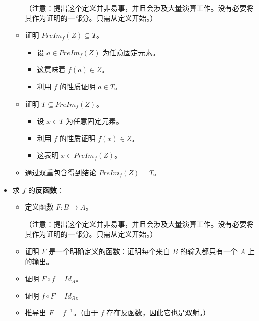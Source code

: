 \begin{itemize}
\begin{itemize}
                    （注意：提出这个定义并非易事，并且会涉及大量演算工作。没有必要将其作为证明的一部分。只需从定义开始。）
              \item 证明 $PreIm_f(Z) \subseteq T$。
                    \begin{itemize}
                        \item 设 $a \in PreIm_f(Z)$ 为任意固定元素。
                        \item 这意味着 $f(a) \in Z$。
                        \item 利用 $f$ 的性质证明 $a \in T$。
                    \end{itemize}
              \item 证明 $T \subseteq PreIm_f(Z)$。
                    \begin{itemize}
                        \item 设 $x \in T$ 为任意固定元素。
                        \item 利用 $f$ 的性质证明 $f(x) \in Z$。
                        \item 这表明 $x \in PreIm_f(Z)$。
                    \end{itemize}
              \item 通过双重包含得到结论 $PreIm_f (Z) = T$。
          \end{itemize}
    \item 求 $f$ 的\textbf{反函数}：
          \begin{itemize}
              \item 定义函数 $F: B \to A$。

                    （注意：提出这个定义并非易事，并且会涉及大量演算工作。没有必要将其作为证明的一部分。只需从定义开始。）
              \item 证明 $F$ 是一个明确定义的函数：证明每个来自 $B$ 的输入都只有一个 $A$ 上的输出。
              \item 证明 $F \circ f = Id_A$。
              \item 证明 $f \circ F = Id_B$。
              \item 推导出 $F = f^{-1}$。（由于 $f$ 存在反函数，因此它也是双射。）
          \end{itemize}
\end{itemize}
